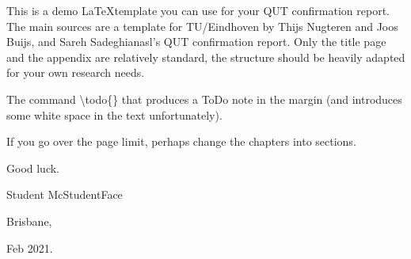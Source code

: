 This is a demo \LaTeX template you can use for your QUT confirmation report. The main sources are a template for TU/Eindhoven by Thijs Nugteren and Joos Buijs, and Sareh Sadeghianasl's QUT confirmation report. Only the title page and the appendix are relatively standard, the structure should be heavily adapted for your own research needs.

The command \textbackslash todo\{\} that produces a  ToDo note in the margin (and introduces some white space in the text unfortunately).

If you go over the page limit, perhaps change the chapters into sections.

Good luck.

\vspace{10pt}

Student McStudentFace

Brisbane,

Feb 2021.